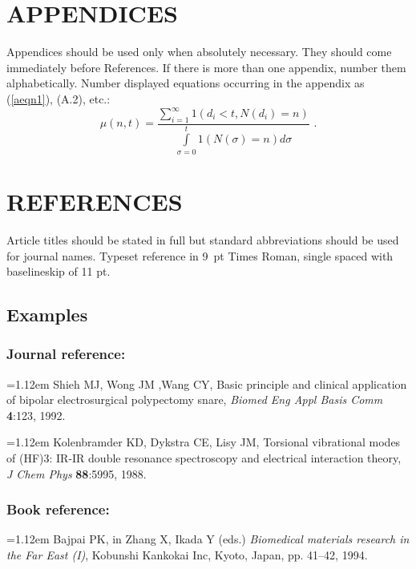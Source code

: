 \documentclass{ws-bme}
\begin{document}
\begin{multicols}{2}
\setcounter{equation}{0}
\renewcommand{\theequation}{A.\arabic{equation}}
\section*{APPENDICES}
\noindent Appendices should be used only
when absolutely necessary. They should come immediately before
References. If there is more than one appendix, number them
alphabetically. Number displayed equations occurring in the
appendix as (\ref{aeqn1}), (A.2), etc.:
\begin{equation}
\mu(n, t) = \frac{\sum\limits^\infty_{i=1} 1(d_i < t, N(d_i) = n)}
{\int\limits^t_{\sigma=0} 1(N(\sigma) = n)d\sigma}\,\,
.\label{aeqn1}
\end{equation}

\section*{REFERENCES}
Article titles should be stated in full but standard abbreviations
should be used for journal names. Typeset reference in 9~pt Times
Roman, single spaced with baselineskip of 11 pt.

\subsection*{Examples}

\subsubsection*{Journal reference:}

\hangindent=1.12em Shieh MJ, Wong JM ,Wang CY, Basic principle and
clinical application of bipolar electrosurgical polypectomy snare,
{\it Biomed Eng Appl Basis Comm} {\bf 4}:123, 1992.

\noindent\hangindent=1.12em Kolenbramder KD, Dykstra CE, Lisy JM,
Torsional vibrational modes of (HF)3: IR-IR double resonance
spectroscopy and electrical interaction theory, {\it J Chem Phys}
{\bf 88}:5995, 1988.

\subsubsection*{Book reference:}

\hangindent=1.12em Bajpai PK, in Zhang X, Ikada Y (eds.) {\it
Biomedical materials research in the Far East (I)}, Kobunshi
Kankokai Inc, Kyoto, Japan, pp. 41--42, 1994.


\end{multicols}
\end{document}
